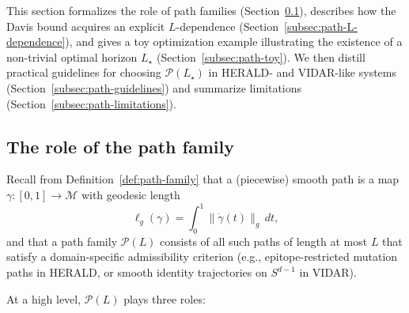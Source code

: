\documentclass[11pt]{article}
\begin{document}
This section formalizes the role of path families (Section~\ref{subsec:path-role}), describes how the
Davis bound acquires an explicit $L$-dependence (Section~\ref{subsec:path-L-dependence}), and gives a
toy optimization example illustrating the existence of a non-trivial optimal horizon
$L_\star$ (Section~\ref{subsec:path-toy}). We then distill practical guidelines for choosing
$\mathcal{P}(L_\star)$ in HERALD- and VIDAR-like systems (Section~\ref{subsec:path-guidelines}) and
summarize limitations (Section~\ref{subsec:path-limitations}).

\subsection{The role of the path family}
\label{subsec:path-role}

Recall from Definition~\ref{def:path-family} that a (piecewise) smooth path is a map
$\gamma : [0,1] \to \mathcal{M}$ with geodesic length
\[
\ell_g(\gamma) = \int_0^1 \big\lVert \dot{\gamma}(t) \big\rVert_{g}\,dt,
\]
and that a path family $\mathcal{P}(L)$ consists of all such paths of length at most $L$ that satisfy
a domain-specific admissibility criterion (e.g., epitope-restricted mutation paths in HERALD, or
smooth identity trajectories on $S^{d-1}$ in VIDAR).

At a high level, $\mathcal{P}(L)$ plays three roles:
\end{document}
